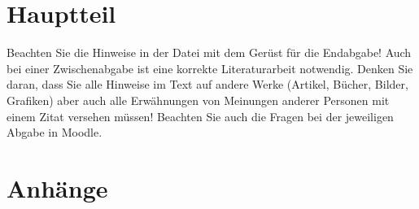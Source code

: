 \documentclass[pdftex,12pt,twoside,footsepline,headsepline,a4paper,final]{scrreprt}
\begin{document}

\tableofcontents
\kontrollseite   %

\chapter{Hauptteil}
\begin{hinweise}
Beachten Sie die Hinweise in der Datei mit dem Gerüst für die Endabgabe! Auch bei einer Zwischenabgabe ist
eine korrekte Literaturarbeit notwendig. Denken Sie daran, dass Sie alle Hinweise im Text auf andere Werke
(Artikel, Bücher, Bilder, Grafiken) aber auch alle Erwähnungen von Meinungen anderer Personen mit einem Zitat
versehen müssen! Beachten Sie auch die Fragen bei der jeweiligen Abgabe in Moodle.
\end{hinweise}



\printbibliography[heading=bibintoc,title={Referenzen und Literaturverzeichnis}]

\appendix
\chapter*{Anh\"{a}nge}

\end{document}

